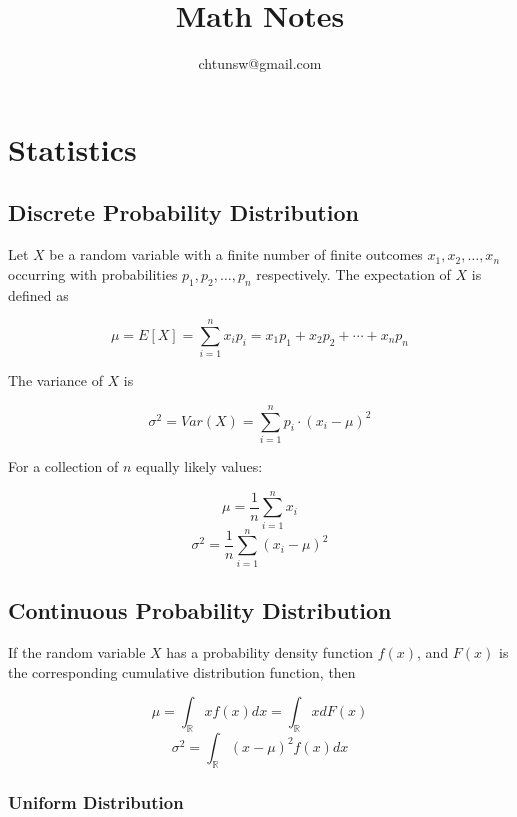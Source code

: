 \documentclass{article}
\title{Math Notes}
\author{chtunsw@gmail.com}
\date{}
\begin{document}
\maketitle

\clearpage

\tableofcontents{}

\clearpage

\section{Statistics}

\subsection{Discrete Probability Distribution}

\noindent Let \(X\) be a random variable with a finite number of finite outcomes \( x_{1},  x_{2}, \ldots, x_{n}\) occurring with probabilities \(p_{1}, p_{2}, \ldots, p_{n}\) respectively. The expectation of \(X\) is defined as

\[\mu = E[X] = \sum_{i=1}^{n}x_{i} p_{i} = x_{1} p_{1} + x_{2} p_{2} + \cdots  + x_{n} p_{n}\]

\noindent The variance of \(X\) is

\[\sigma^{2} = Var(X) = \sum_{i=1}^{n}p_{i} \cdot (x_{i} - \mu)^{2}\]

\noindent For a collection of \(n\) equally likely values:

\[\mu = \frac {1}{n} \sum_{i=1}^{n} x_{i}\]
\[\sigma^{2} = \frac {1}{n} \sum_{i=1}^{n} (x_{i} - \mu)^{2}\]

\subsection{Continuous Probability Distribution}

\noindent If the random variable \(X\) has a probability density function \(f(x)\), and \(F(x)\) is the corresponding cumulative distribution function, then

\[\mu =\int_{\mathbb{R}} x f(x) dx = \int_{\mathbb{R}} x dF(x)\]
\[\sigma^{2} = \int_{\mathbb{R}}(x - \mu)^{2} f(x) dx\]

\subsubsection{Uniform Distribution}
\end{document}
